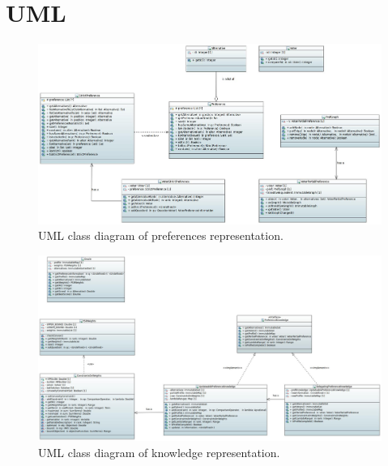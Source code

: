 \section{UML}


\begin{center}
\end{center}

\begin{figure}
	\centering
	\includegraphics[width=\textwidth]{uml/Basic.jpeg}
	\caption{UML class diagram of preferences representation.}
\end{figure}

\begin{figure}
	\centering
	\includegraphics[width=\textwidth]{uml/model.jpeg}
	\caption{UML class diagram of knowledge representation.}
\end{figure}

